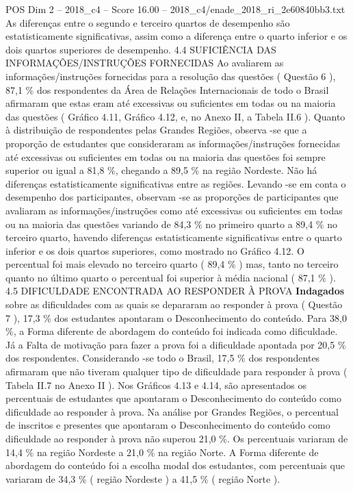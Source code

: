 \begin{textsample}{POS Dim 2 – 2018\_c4 – Score 16.00 – 2018\_c4/enade\_2018\_ri\_2e60840bb3.txt}
As diferenças entre o segundo e terceiro quartos de desempenho são estatisticamente significativas, assim como a diferença entre o quarto inferior e os dois quartos superiores de desempenho. 4.4 SUFICIÊNCIA DAS INFORMAÇÕES/INSTRUÇÕES FORNECIDAS Ao avaliarem as informações/instruções fornecidas para a resolução das questões ( Questão 6 ), 87,1 \% dos respondentes da Área de Relações Internacionais de todo o Brasil afirmaram que estas eram até excessivas ou suficientes em todas ou na maioria das questões ( Gráfico 4.11, Gráfico 4.12, e, no Anexo II, a Tabela II.6 ).
Quanto à distribuição de respondentes pelas Grandes Regiões, observa -se que a proporção de estudantes que consideraram as informações/instruções fornecidas até excessivas ou suficientes em todas ou na maioria das questões foi sempre superior ou igual a 81,8 \%, chegando a 89,5 \% na região Nordeste.
Não há diferenças estatisticamente significativas entre as regiões.
Levando -se em conta o desempenho dos participantes, observam -se as proporções de participantes que avaliaram as informações/instruções como até excessivas ou suficientes em todas ou na maioria das questões variando de 84,3 \% no primeiro quarto a 89,4 \% no terceiro quarto, havendo diferenças estatisticamente significativas entre o quarto inferior e os dois quartos superiores, como mostrado no Gráfico 4.12.
O percentual foi mais elevado no terceiro quarto ( 89,4 \% ) mas, tanto no terceiro quanto no último quarto o percentual foi superior à média nacional ( 87,1 \% ). 4.5 DIFICULDADE ENCONTRADA AO RESPONDER À PROVA \textbf{Indagados} sobre as dificuldades com as quais se depararam ao responder à prova ( Questão 7 ), 17,3 \% dos estudantes apontaram o Desconhecimento do conteúdo.
Para 38,0 \%, a Forma diferente de abordagem do conteúdo foi indicada como dificuldade.
Já a Falta de motivação para fazer a prova foi a dificuldade apontada por 20,5 \% dos respondentes.
Considerando -se todo o Brasil, 17,5 \% dos respondentes afirmaram que não tiveram qualquer tipo de dificuldade para responder à prova ( Tabela II.7 no Anexo II ).
Nos Gráficos 4.13 e 4.14, são apresentados os percentuais de estudantes que apontaram o Desconhecimento do conteúdo como dificuldade ao responder à prova.
Na análise por Grandes Regiões, o percentual de inscritos e presentes que apontaram o Desconhecimento do conteúdo como dificuldade ao responder à prova não superou 21,0 \%.
Os percentuais variaram de 14,4 \% na região Nordeste a 21,0 \% na região Norte.
A Forma diferente de abordagem do conteúdo foi a escolha modal dos estudantes, com percentuais que variaram de 34,3 \% ( região Nordeste ) a 41,5 \% ( região Norte ).

\end{textsample}
